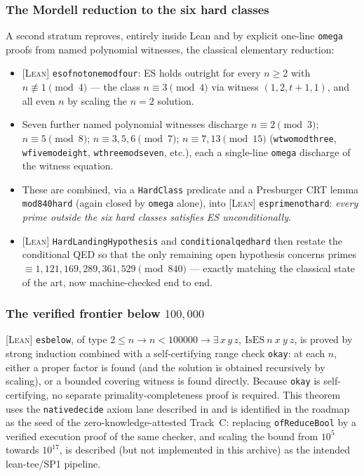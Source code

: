 \documentclass[11pt]{article}
\theoremstyle{plain}
\theoremstyle{definition}
\theoremstyle{remark}
\newcommand{\LEAN}{\textcolor{proved}{\textsc{[Lean]}}}
\newcommand{\lean}[1]{\texttt{#1}}
\renewcommand{\_}{\textunderscore\allowbreak}
\begin{document}
\subsubsection{The Mordell reduction to the six hard classes}
\label{subsec:mordell}

A second stratum reproves, entirely inside Lean and by explicit one-line \texttt{omega} proofs
from named polynomial witnesses, the classical elementary reduction:
\begin{itemize}[leftmargin=1.4em]
  \item \LEAN{} \lean{es\_of\_not\_one\_mod\_four}: ES holds outright for every $n\ge 2$ with
        $n\not\equiv 1\pmod 4$ — the class $n\equiv 3\pmod 4$ via witness $(1,2,t+1,1)$, and all
        even $n$ by scaling the $n=2$ solution.
  \item Seven further named polynomial witnesses discharge $n\equiv 2\pmod 3$;
        $n\equiv 5\pmod 8$; $n\equiv 3,5,6\pmod 7$; $n\equiv 7,13\pmod{15}$
        (\lean{w\_two\_mod\_three}, \lean{w\_five\_mod\_eight}, \lean{w\_three\_mod\_seven}, etc.),
        each a single-line \texttt{omega} discharge of the witness equation.
  \item These are combined, via a \lean{HardClass} predicate and a Presburger CRT lemma
        \lean{mod840\_hard} (again closed by \texttt{omega} alone), into
        \LEAN{} \lean{es\_prime\_not\_hard}: \emph{every prime outside the six hard classes
        satisfies ES unconditionally}.
  \item \LEAN{} \lean{HardLandingHypothesis} and \lean{conditional\_qed\_hard} then restate the
        conditional QED so that the only remaining open hypothesis concerns primes
        $\equiv 1,121,169,289,361,529\pmod{840}$ — exactly matching the classical state of the
        art, now machine-checked end to end.
\end{itemize}

\subsubsection{The verified frontier below $100{,}000$}

\LEAN{} \lean{es\_below\_100000}, of type
$2\le n \to n < 100000 \to \exists\, x\,y\,z,\ \mathrm{IsES}\ n\ x\ y\ z$,
is proved by strong induction combined with a self-certifying range check \lean{okay}: at each
$n$, either a proper factor is found (and the solution is obtained recursively by scaling), or a
bounded covering witness is found directly. Because \lean{okay} is self-certifying, no separate
primality-completeness proof is required. This theorem uses the \texttt{native\_decide} axiom
lane described in  and is identified in the roadmap as the seed of the
zero-knowledge-attested Track~C: replacing \lean{ofReduceBool} by a verified execution proof of
the same checker, and scaling the bound from $10^5$ towards $10^{17}$, is described (but not
implemented in this archive) as the intended lean-tee/SP1 pipeline.
\end{document}
